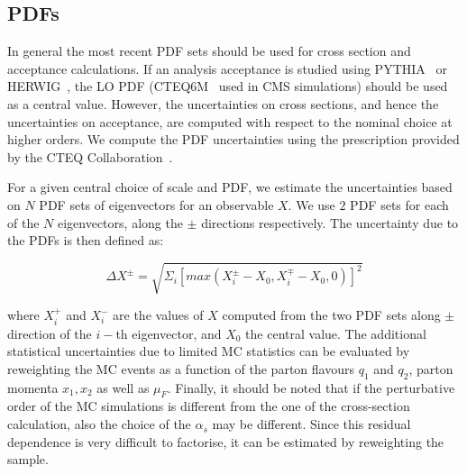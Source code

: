 \subsection{PDFs}
In general the most recent PDF sets should be used for cross section and 
acceptance calculations. If an analysis acceptance is studied using 
PYTHIA~\cite{Pythia} or HERWIG~\cite{Herwig}, the LO PDF (CTEQ6M~\cite{cteq6m} 
used in CMS simulations) should be used as a central value. However, the 
uncertainties on cross sections, and hence the uncertainties on acceptance, are 
computed with respect to the nominal choice at higher orders. %
We compute the PDF uncertainties using the prescription provided by the CTEQ 
Collaboration~\cite{cteq6m}. 

For a given central choice of scale and PDF, we estimate the uncertainties 
based on $N$ PDF sets of eigenvectors for an observable $X$. We use $2$ PDF 
sets for each of the $N$ eigenvectors, along the $\pm$ directions respectively. 
The uncertainty due to the PDFs is then defined as:

\begin{equation}
	\Delta X^{\pm} = \sqrt{\Sigma_i [max(X_i^\pm-X_0,X_i^\mp-X_0,0)]^2 }
\end{equation}

where $X_i^+$ and $X_i^-$ are the values of $X$ computed from the two PDF sets 
along $\pm$ direction of the $i-$th eigenvector, and $X_0$ the central value. 
The additional statistical 
uncertainties due to limited MC statistics can be evaluated by reweighting the 
MC events as a function of the parton flavours $q_1$ and $q_2$, parton momenta 
$x_1, x_2$ as well as $\mu_F$. Finally, it should be noted that if the perturbative
order of the MC simulations is different from the one of the cross-section 
calculation, also the choice of the $\alpha_s$ may be different. Since this 
residual dependence is very difficult to factorise, it can be estimated by 
reweighting the sample.
